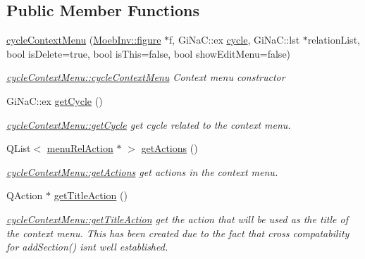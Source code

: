 \subsection*{Public Member Functions}
\begin{DoxyCompactItemize}
\item 
\mbox{\hyperlink{classcycle_context_menu_a0a948765494ab4b2ecf73c89123f7f14}{cycle\+Context\+Menu}} (\mbox{\hyperlink{class_moeb_inv_1_1figure}{Moeb\+Inv\+::figure}} $\ast$f, Gi\+Na\+C\+::ex \mbox{\hyperlink{class_moeb_inv_1_1cycle}{cycle}}, Gi\+Na\+C\+::lst $\ast$relation\+List, bool is\+Delete=true, bool is\+This=false, bool show\+Edit\+Menu=false)
\begin{DoxyCompactList}\small\item\em \mbox{\hyperlink{classcycle_context_menu_a0a948765494ab4b2ecf73c89123f7f14}{cycle\+Context\+Menu\+::cycle\+Context\+Menu}} Context menu constructor \end{DoxyCompactList}\item 
Gi\+Na\+C\+::ex \mbox{\hyperlink{classcycle_context_menu_a35b3868cdc32b97e7c4abc109ee13460}{get\+Cycle}} ()
\begin{DoxyCompactList}\small\item\em \mbox{\hyperlink{classcycle_context_menu_a35b3868cdc32b97e7c4abc109ee13460}{cycle\+Context\+Menu\+::get\+Cycle}} get cycle related to the context menu. \end{DoxyCompactList}\item 
Q\+List$<$ \mbox{\hyperlink{classmenu_rel_action}{menu\+Rel\+Action}} $\ast$ $>$ \mbox{\hyperlink{classcycle_context_menu_a4dd57e4522c46a70367b6b721f23bcc9}{get\+Actions}} ()
\begin{DoxyCompactList}\small\item\em \mbox{\hyperlink{classcycle_context_menu_a4dd57e4522c46a70367b6b721f23bcc9}{cycle\+Context\+Menu\+::get\+Actions}} get actions in the context menu. \end{DoxyCompactList}\item 
Q\+Action $\ast$ \mbox{\hyperlink{classcycle_context_menu_a0e955d1a633d3585d11b7c193341a568}{get\+Title\+Action}} ()
\begin{DoxyCompactList}\small\item\em \mbox{\hyperlink{classcycle_context_menu_a0e955d1a633d3585d11b7c193341a568}{cycle\+Context\+Menu\+::get\+Title\+Action}} get the action that will be used as the title of the context menu. This has been created due to the fact that cross compatability for \textquotesingle{}add\+Section()\textquotesingle{} isn\textquotesingle{}t well established. \end{DoxyCompactList}\item 

\end{DoxyCompactItemize}
